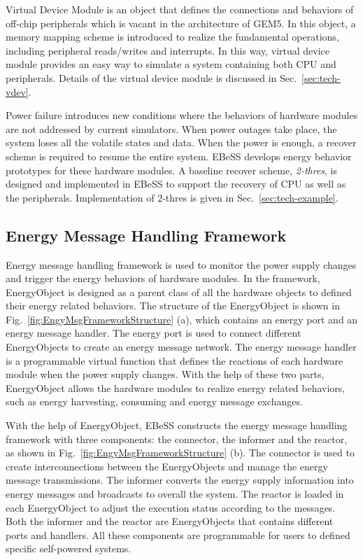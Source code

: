%
Virtual Device Module is an object that defines the connections and behaviors of off-chip peripherals which is vacant in the architecture of GEM5.
In this object, a memory mapping scheme is introduced to realize the fundamental operations, including peripheral reads/writes and interrupts.
In this way, virtual device module provides an easy way to simulate a system containing both CPU and peripherals.
Details of the virtual device module is discussed in Sec.~\ref{sec:tech-vdev}.

%
Power failure introduces new conditions where the behaviors of hardware modules are not addressed by current simulators.
When power outages take place, the system loses all the volatile states and data.
When the power is enough, a recover scheme is required to resume the entire system.
EBeSS develops energy behavior prototypes for these hardware modules.
A baseline recover scheme, \emph{2-thres}, is designed and implemented in EBeSS to support the recovery of CPU as well as the peripherals.
Implementation of 2-thres is given in Sec.~\ref{sec:tech-example}.


\subsection{Energy Message Handling Framework}	\label{sec:tech-EMHF}
Energy message handling framework is used to monitor the power supply changes and trigger the energy behaviors of hardware modules.
In the framework, EnergyObject is designed as a parent class of all the hardware objects to defined their energy related behaviors. 
The structure of the EnergyObject is shown in Fig.~\ref{fig:EngyMsgFrameworkStructure} (a), which contains an energy port and an energy message handler.
The energy port is used to connect different EnergyObjects to create an energy message network.
The energy message handler is a programmable virtual function that defines the reactions of each hardware module when the power supply changes.
With the help of these two parts, EnergyObject allows the hardware modules to realize energy related behaviors, such as energy harvesting, consuming and energy message exchanges.

With the help of EnergyObject, EBeSS constructs the energy message handling framework with three components: the connector, the informer and the reactor, as shown in Fig.~\ref{fig:EngyMsgFrameworkStructure} (b).
The connector is used to create interconnections between the EnergyObjects and manage the energy message transmissions.
The informer converts the energy supply information into energy messages and broadcasts to overall the system.
The reactor is loaded in each EnergyObject to adjust the execution status according to the messages.
Both the informer and the reactor are EnergyObjects that contains different ports and handlers.
All these components are programmable for users to defined specific self-powered systems.

